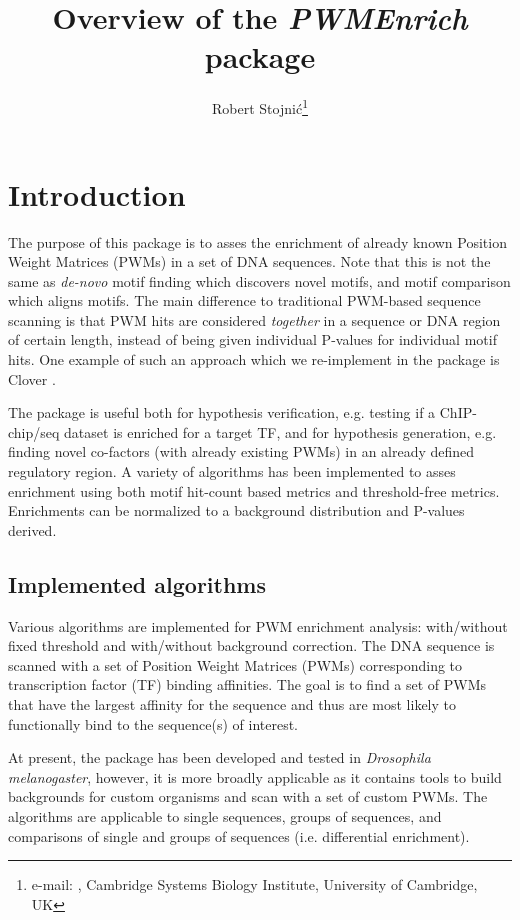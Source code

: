 \documentclass{article}
\author{Robert Stojni\'{c}\footnote{
  e-mail: \email{robert.stojnic@gmail.com},
  Cambridge Systems Biology Institute,
  University of Cambridge, UK}
}
\newcommand{\Rpackage}[1]{{\textit{#1}}}
\begin{document}
\title{Overview of the \Rpackage{PWMEnrich} package}

\maketitle

\tableofcontents

\section{Introduction}\label{sec:intro} 

The purpose of this package is to asses the enrichment of already known Position Weight Matrices (PWMs) in a set of DNA sequences. Note that this is not the same as \textit{de-novo} motif finding which discovers novel motifs, and motif comparison which aligns motifs. The main difference to traditional PWM-based sequence scanning is that PWM hits are considered \textit{together} in a sequence or DNA region of certain length, instead of being given individual P-values for individual motif hits. One example of such an approach which we re-implement in the package is Clover \citep{frith_detection_2004}. 

The package is useful both for hypothesis verification, e.g. testing if a ChIP-chip/seq dataset is enriched for a target TF, and for hypothesis generation, e.g. finding novel co-factors (with already existing PWMs) in an already defined regulatory region. A variety of algorithms has been implemented to asses enrichment using both motif hit-count based metrics and threshold-free metrics. Enrichments can be normalized to a background distribution and P-values derived. 

\subsection{Implemented algorithms}

Various algorithms are implemented for PWM enrichment analysis: with/without fixed threshold and with/without background correction. The DNA sequence is scanned with a set of Position Weight Matrices (PWMs) corresponding to transcription factor (TF) binding affinities. The goal is to find a set of PWMs that have the largest affinity for the sequence and thus are most likely to functionally bind to the sequence(s) of interest. 

At present, the package has been developed and tested in \textit{Drosophila melanogaster}, however, it is more broadly applicable as it contains tools to build backgrounds for custom organisms and scan with a set of custom PWMs. The algorithms are applicable to single sequences, groups of sequences, and comparisons of single and groups of sequences (i.e. differential enrichment). 
\end{document}
